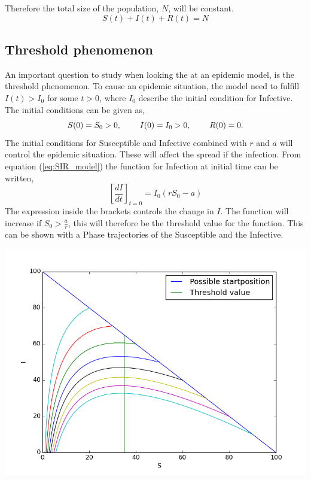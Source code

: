 \documentclass[%
twoside,                 %
final,                   %
10pt]{article}
\begin{document}
Therefore the total size of the population, $N$, will be constant. 
\begin{equation} \label{eq:SIR_N}
S(t)+I(t)+R(t) = N
\end{equation}

\subsection{Threshold phenomenon}
An important question to study when looking the at an epidemic model, is the threshold phenomenon. To cause an epidemic situation, the model need to fulfill $I(t)> I_0$ for some $t>0$, where $I_0$ describe the initial condition for Infective. The initial conditions can be given as,
\begin{equation}
S(0)=S_0 > 0,\hspace{8mm} I(0)=I_0>0,\hspace{8mm} R(0) =0.
\end{equation}
The initial conditions for Susceptible and Infective combined with $r$ and $a$ will control the epidemic situation. These will affect the spread if the infection. From equation (\ref{eq:SIR_model}) the function for Infection at initial time can be written,
\begin{equation}
\left[\frac{dI}{dt}\right]_{t=0} = I_0(rS_0-a)
\end{equation}
The expression inside the brackets controls the change in $I$. The function will increase if $S_0 > \frac{a}{r}$, this will therefore be the threshold value for the function. This can be shown with a Phase trajectories of the Susceptible and the Infective.  


\begin{center}  %
  \centerline{\includegraphics[width=0.9\linewidth]{plots/threshold_phenomenon.png}}
\end{center}
\end{document}
